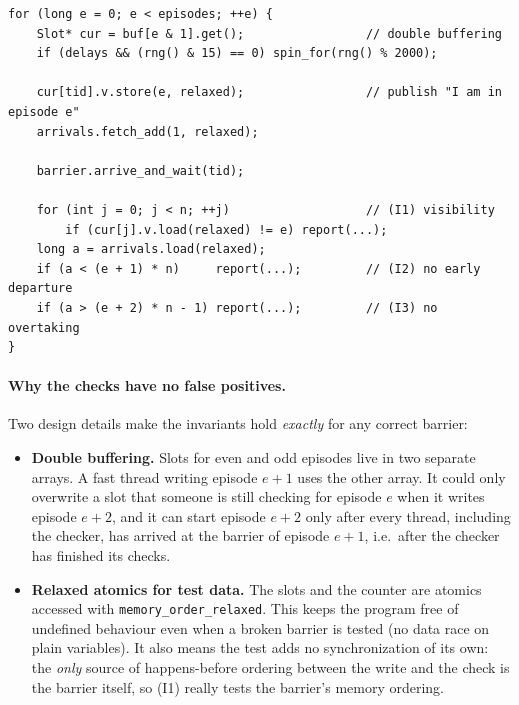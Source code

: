 \begin{lstlisting}[caption={Per-thread test loop (\texttt{test\_barrier.cpp}, simplified).},label={lst:ex2-test}]
for (long e = 0; e < episodes; ++e) {
    Slot* cur = buf[e & 1].get();                 // double buffering
    if (delays && (rng() & 15) == 0) spin_for(rng() % 2000);

    cur[tid].v.store(e, relaxed);                 // publish "I am in episode e"
    arrivals.fetch_add(1, relaxed);

    barrier.arrive_and_wait(tid);

    for (int j = 0; j < n; ++j)                   // (I1) visibility
        if (cur[j].v.load(relaxed) != e) report(...);
    long a = arrivals.load(relaxed);
    if (a < (e + 1) * n)     report(...);         // (I2) no early departure
    if (a > (e + 2) * n - 1) report(...);         // (I3) no overtaking
}
\end{lstlisting}

\paragraph{Why the checks have no false positives.} Two design details make
the invariants hold \emph{exactly} for any correct barrier:

\begin{itemize}
    \item \textbf{Double buffering.} Slots for even and odd episodes live in
          two separate arrays. A fast thread writing episode $e+1$ uses the
          other array. It could only overwrite a slot that someone is still
          checking for episode $e$ when it writes episode $e+2$, and it can
          start episode $e+2$ only after every thread, including the
          checker, has arrived at the barrier of episode $e+1$, i.e.\ after
          the checker has finished its checks.
    \item \textbf{Relaxed atomics for test data.} The slots and the counter
          are atomics accessed with \texttt{memory\_order\_relaxed}. This
          keeps the program free of undefined behaviour even when a broken
          barrier is tested (no data race on plain variables). It also
          means the test adds no synchronization of its own: the
          \emph{only} source of happens-before ordering between the write
          and the check is the barrier itself, so (I1) really tests the
          barrier's memory ordering.
\end{itemize}

